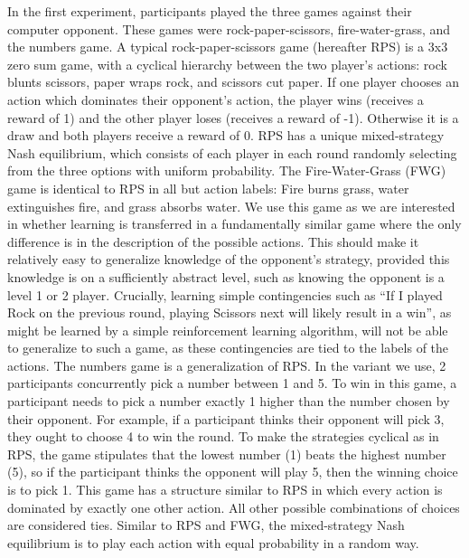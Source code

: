 \documentclass[man,floatsintext]{apa6}
\begin{document}
In the first experiment, participants played the three games against their computer opponent. These games were rock-paper-scissors, fire-water-grass, and the numbers game. A typical rock-paper-scissors game (hereafter RPS) is a 3x3 zero sum game, with a cyclical hierarchy between the two player's actions: rock blunts scissors, paper wraps rock, and scissors cut paper. If one player chooses an action which dominates their opponent's action, the player wins (receives a reward of 1) and the other player loses (receives a reward of -1). Otherwise it is a draw and both players receive a reward of 0. RPS has a unique mixed-strategy Nash equilibrium, which consists of each player in each round randomly selecting from the three options with uniform probability. The Fire-Water-Grass (FWG) game is identical to RPS in all but action labels: Fire burns grass, water extinguishes fire, and grass absorbs water. We use this game as we are interested in whether learning is transferred in a fundamentally similar game where the only difference is in the description of the possible actions. This should make it relatively easy to generalize knowledge of the opponent's strategy, provided this knowledge is on a sufficiently abstract level, such as knowing the opponent is a level 1 or 2 player. Crucially, learning simple contingencies such as ``If I played Rock on the previous round, playing Scissors next will likely result in a win'', as might be learned by a simple reinforcement learning algorithm, will not be able to generalize to such a game, as these contingencies are tied to the labels of the actions. The numbers game is a generalization of RPS. In the variant we use, 2 participants concurrently pick a number between 1 and 5. To win in this game, a participant needs to pick a number exactly 1 higher than the number chosen by their opponent. For example, if a participant thinks their opponent will pick 3, they ought to choose 4 to win the round. To make the strategies cyclical as in RPS, the game stipulates that the lowest number (1) beats the highest number (5), so if the participant thinks the opponent will play 5, then the winning choice is to pick 1. This game has a structure similar to RPS in which every action is dominated by exactly one other action. All other possible combinations of choices are considered ties. Similar to RPS and FWG, the mixed-strategy Nash equilibrium is to play each action with equal probability in a random way.
\end{document}
